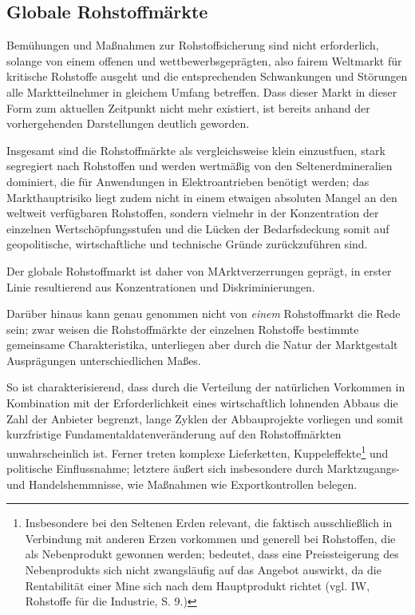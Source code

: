 \documentclass[12pt,a4paper,oneside]{book} %
\begin{document}
\subsection{Globale Rohstoffmärkte}

Bemühungen und Maßnahmen zur Rohstoffsicherung sind nicht erforderlich, solange von einem offenen und wettbewerbsgeprägten, also fairem Weltmarkt für kritische Rohstoffe ausgeht und die entsprechenden Schwankungen und Störungen alle Marktteilnehmer in gleichem Umfang betreffen. Dass dieser Markt in dieser Form zum aktuellen Zeitpunkt nicht mehr existiert, ist bereits anhand der vorhergehenden Darstellungen deutlich geworden. 

Insgesamt sind die Rohstoffmärkte als vergleichsweise klein einzustfuen, stark segregiert nach Rohstoffen und werden wertmäßig von den Seltenerdmineralien dominiert, die für Anwendungen in Elektroantrieben benötigt werden; das Markthauptrisiko liegt zudem nicht in einem etwaigen absoluten Mangel an den weltweit verfügbaren Rohstoffen, sondern vielmehr in der Konzentration der einzelnen Wertschöpfungsstufen und die Lücken der Bedarfsdeckung somit auf geopolitische, wirtschaftliche und technische Gründe zurückzuführen sind.\autocite{Applied Resource Policy Lab: The Risks of the Rare Earths Rush, https://arplab.org/insights/the-risks-of-the-rare-earths-rush/}

Der globale Rohstoffmarkt ist daher von MArktverzerrungen geprägt, in erster Linie resultierend aus Konzentrationen und Diskriminierungen.

Darüber hinaus kann genau genommen nicht von \textit{einem} Rohstoffmarkt die Rede sein; zwar weisen die Rohstoffmärkte der einzelnen Rohstoffe bestimmte gemeinsame Charakteristika, unterliegen aber durch die Natur der Marktgestalt Ausprägungen unterschiedlichen Maßes.

So ist charakterisierend, dass durch die Verteilung der natürlichen Vorkommen in Kombination mit der Erforderlichkeit eines wirtschaftlich lohnenden Abbaus die Zahl der Anbieter begrenzt, lange Zyklen der Abbauprojekte vorliegen und somit kurzfristige Fundamentaldatenveränderung auf den Rohstoffmärkten unwahrscheinlich ist.\autocite{IW Rohstoffe für die Industrie, S. 8-9} Ferner treten komplexe Lieferketten, Kuppeleffekte\footnote{Insbesondere bei den Seltenen Erden relevant, die faktisch ausschließlich in Verbindung mit anderen Erzen vorkommen und generell bei Rohstoffen, die als Nebenprodukt gewonnen werden; bedeutet, dass eine Preissteigerung des Nebenprodukts sich nicht zwangsläufig auf das Angebot auswirkt, da die Rentabilität einer Mine sich nach dem Hauptprodukt richtet (vgl. IW, Rohstoffe für die Industrie, S. 9.)} und politische Einflussnahme; letztere äußert sich insbesondere durch Marktzugangs- und Handelshemmnisse, wie Maßnahmen wie Exportkontrollen belegen.
\end{document}

